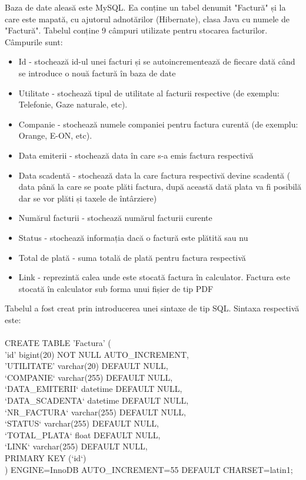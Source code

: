 \documentclass[12pt]{book}
\begin{document}
Baza de date aleasă este MySQL. Ea conține un tabel denumit "Factură" și la care este mapată, cu ajutorul adnotărilor (Hibernate), clasa Java cu numele de "Factură". Tabelul conține 9 câmpuri utilizate pentru stocarea facturilor. Câmpurile sunt:
\begin{addmargin}[4em]{1em}
	\begin{itemize}
		\item Id - stochează id-ul unei facturi și se autoincrementează de fiecare dată când se introduce o nouă factură în baza de date
		\item Utilitate - stochează tipul de utilitate al facturii respective (de exemplu: Telefonie, Gaze naturale, etc).
		\item Companie - stochează numele companiei pentru factura curentă (de exemplu: Orange, E-ON, etc).
		\item Data emiterii - stochează data în care s-a emis factura respectivă
		\item Data scadentă - stochează data la care factura respectivă devine scadentă ( data până la care se poate plăti factura, după această dată plata va fi posibilă dar se vor plăti și taxele de întârziere)
		\item Numărul facturii - stochează numărul facturii curente
		\item Status - stochează informația dacă o factură este plătită sau nu
		\item Total de plată - suma totală de plată pentru factura respectivă
		\item Link - reprezintă calea unde este stocată factura în calculator. Factura este stocată în calculator sub forma unui fișier de tip PDF
	\end{itemize}
\end{addmargin}

Tabelul a fost creat prin introducerea unei sintaxe de tip SQL. Sintaxa respectivă este:\\\\
CREATE TABLE 'Factura' (\\
'id' bigint(20) NOT NULL AUTO\_INCREMENT,\\
'UTILITATE' varchar(20) DEFAULT NULL,\\
`COMPANIE` varchar(255) DEFAULT NULL,\\
`DATA\_EMITERII` datetime DEFAULT NULL,\\
`DATA\_SCADENTA` datetime DEFAULT NULL,\\
`NR\_FACTURA` varchar(255) DEFAULT NULL,\\
`STATUS` varchar(255) DEFAULT NULL,\\
`TOTAL\_PLATA` float DEFAULT NULL,\\
`LINK` varchar(255) DEFAULT NULL,\\
PRIMARY KEY (`id`)\\
) ENGINE=InnoDB AUTO\_INCREMENT=55 DEFAULT CHARSET=latin1;\\
\end{document}
